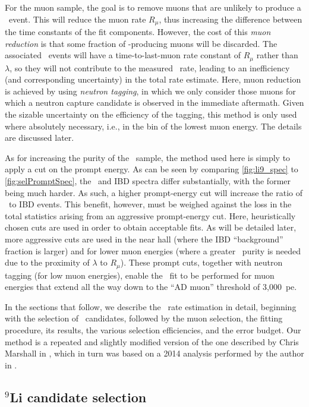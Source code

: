 \documentclass[../thesis.tex]{subfiles}
\begin{document}
For the muon sample, the goal is to remove muons that are unlikely to produce a \linine\ event. This will reduce the muon rate $R_\mu$, thus increasing the difference between the time constants of the fit components. However, the cost of this \emph{muon reduction} is that some fraction of \linine-producing muons will be discarded. The associated \linine\ events will have a time-to-last-muon rate constant of $R_\mu$ rather than $\lambda$, so they will not contribute to the measured \linine\ rate, leading to an inefficiency (and corresponding uncertainty) in the total rate estimate. Here, muon reduction is achieved by using \emph{neutron tagging}, in which we only consider those muons for which a neutron capture candidate is observed in the immediate aftermath. Given the sizable uncertainty on the efficiency of the tagging, this method is only used where absolutely necessary, i.e., in the bin of the lowest muon energy. The details are discussed later.

As for increasing the purity of the \linine\ sample, the method used here is simply to apply a cut on the prompt energy. As can be seen by comparing \autoref{fig:li9_spec} to \autoref{fig:selPromptSpec}, the \linine\ and IBD spectra differ substantially, with the former being much harder. As such, a higher prompt-energy cut will increase the ratio of \linine\ to IBD events. This benefit, however, must be weighed against the loss in the total statistics arising from an aggressive prompt-energy cut. Here, heuristically chosen cuts are used in order to obtain acceptable fits. As will be detailed later, more aggressive cuts are used in the near hall (where the IBD ``background'' fraction is larger) and for lower muon energies (where a greater \linine\ purity is needed due to the proximity of $\lambda$ to $R_\mu$). These prompt cuts, together with neutron tagging (for low muon energies), enable the \linine\ fit to be performed for muon energies that extend all the way down to the ``AD muon'' threshold of 3,000~pe.

In the sections that follow, we describe the \linine\ rate estimation in detail, beginning with the selection of \linine\ candidates, followed by the muon selection, the fitting procedure, its results, the various selection efficiencies, and the error budget. Our method is a repeated and slightly modified version of the one described by Chris Marshall in \cite{ChrisLi9}, which in turn was based on a 2014 analysis performed by the author in \cite{MattLi9}.

\subsection{$^9$Li candidate selection}
\label{sec:bkgLi9Sel}
\end{document}
